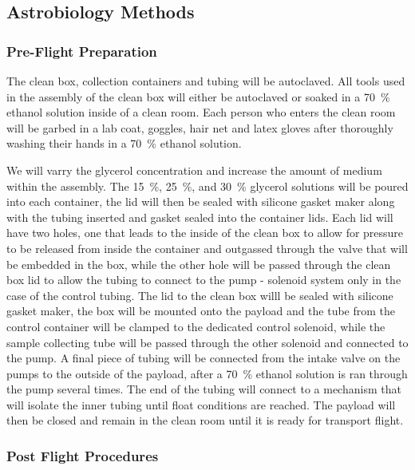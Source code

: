 \subsection{Astrobiology Methods}
\label{sec:Astrobiology Methods}

\subsubsection{Pre-Flight Preparation}

The clean box, collection containers and tubing will be autoclaved. All tools used in the assembly of the clean box will either be autoclaved or soaked in a \SI{70}{\percent} ethanol solution inside of a clean room. Each person who enters the clean room will be garbed in a lab coat, goggles, hair net and latex gloves after thoroughly washing their hands in a \SI{70}{\percent} ethanol solution. 

We will varry the glycerol concentration and increase the amount of medium within the assembly.  The \SI{15}{\percent}, \SI{25}{\percent}, and \SI{30}{\percent} glycerol solutions will be poured into each container, the lid will then be sealed with silicone gasket maker along with the tubing inserted and gasket sealed into the container lids. Each lid will have two holes, one that leads to the inside of the clean box to allow for pressure to be released from inside the container and outgassed through the valve that will be embedded in the box, while the other hole will be passed through the clean box lid to allow the tubing to connect to the pump - solenoid system only in the case of the control tubing. The lid to the clean box willl be sealed with silicone gasket maker, the box will be mounted onto the payload and the tube from the control container will be clamped to the dedicated control solenoid, while the sample collecting tube will be passed through the other solenoid and connected to the pump. A final piece of tubing will be connected from the intake valve on the pumps to the outside of the payload, after a \SI{70}{\percent} ethanol solution is ran through the pump several times. The end of the tubing will connect to a mechanism that will isolate the inner tubing until float conditions are reached. The payload will then be closed and remain  in the clean room until it is ready for transport flight.

\subsubsection{Post Flight Procedures}

